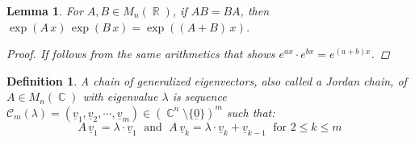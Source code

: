 \documentclass[12pt]{article}
\DeclareMathOperator{\R}{\mathbb{R}}
\DeclareMathOperator{\C}{\mathbb{C}}
\newcommand{\tuple}[1]{\underline{#1}}
\newtheorem{definition}[theorem]{Definition}
\newtheorem{lemma}[theorem]{Lemma}
\begin{document}

\begin{lemma}
  For $A,B\in M_n(\R)$, if $AB=BA$, then $\exp(A\,x)\,\exp(B\,x)=\exp((A+B)\,x)$.
  \begin{proof}
    If follows from the same arithmetics that shows $e^{ax}\cdot e^{bx}=e^{(a+b)x}$.
  \end{proof}
\end{lemma}

\begin{definition}
  A chain of generalized eigenvectors, also called a Jordan chain, of $A\in M_n(\C)$ with eigenvalue $\lambda$ is sequence $\mathcal{C}_m(\lambda)=(\tuple{v}_1,\tuple{v}_2,\cdots,\tuple{v}_m)\in( \C^n\setminus\{\tuple{0}\})^m$ such that:
  $$A\,\tuple{v}_1=\lambda\cdot \tuple{v}_1\;\text{ and }\; A\,\tuple{v}_k=\lambda\cdot \tuple{v}_k+\tuple{v}_{k-1}\;\text{ for }2\leq k\leq m$$
\end{definition}
\end{document}
